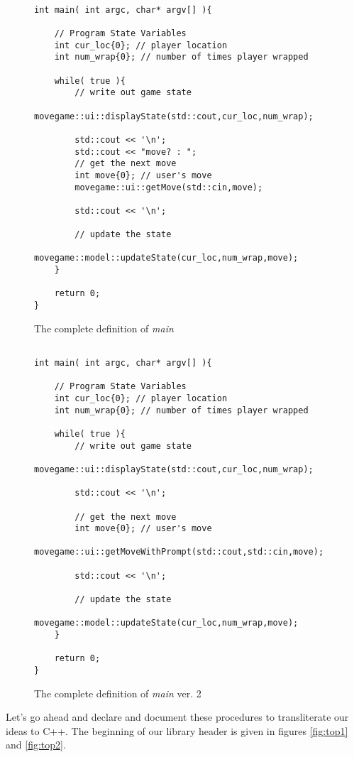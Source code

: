 \documentclass[nobib]{tufte-handout}
\begin{document}
\begin{figure}[!htbp]
\begin{lstlisting}

int main( int argc, char* argv[] ){

	// Program State Variables
	int cur_loc{0}; // player location
	int num_wrap{0}; // number of times player wrapped
	
	while( true ){
		// write out game state
		movegame::ui::displayState(std::cout,cur_loc,num_wrap);		

		std::cout << '\n';
		std::cout << "move? : ";
		// get the next move
		int move{0}; // user's move
		movegame::ui::getMove(std::cin,move);

		std::cout << '\n';		
		
		// update the state
		movegame::model::updateState(cur_loc,num_wrap,move);		
	}

	return 0;
}
\end{lstlisting}
\caption{The complete definition of \textit{main}}
\label{fig:main-final1}
\end{figure}




\begin{figure}[!htbp]
\begin{lstlisting}

int main( int argc, char* argv[] ){

	// Program State Variables
	int cur_loc{0}; // player location
	int num_wrap{0}; // number of times player wrapped
	
	while( true ){
		// write out game state
		movegame::ui::displayState(std::cout,cur_loc,num_wrap);		

		std::cout << '\n';
		
		// get the next move
		int move{0}; // user's move
		movegame::ui::getMoveWithPrompt(std::cout,std::cin,move);

		std::cout << '\n';		
		
		// update the state
		movegame::model::updateState(cur_loc,num_wrap,move);		
	}

	return 0;
}
\end{lstlisting}
\caption{The complete definition of \textit{main} ver. 2}
\label{fig:main-final2}
\end{figure}

Let's go ahead and declare and document these procedures to transliterate our ideas to C++.  The beginning of our library header is given in figures \ref{fig:top1} and \ref{fig:top2}.
\end{document}

